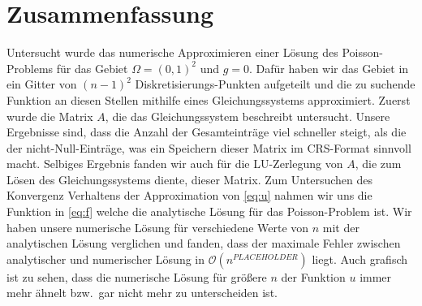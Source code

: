 \documentclass{scrartcl}
\newcommand\BigO{\mathcal{O}}
\begin{document}
\section{Zusammenfassung}

Untersucht wurde das numerische Approximieren einer Lösung des Poisson-Problems
für das Gebiet \(\Omega = {(0, 1)}^2\) und \(g = 0\). Dafür haben wir das
Gebiet in ein Gitter von \({(n - 1)}^2\) Diskretisierungs-Punkten aufgeteilt
und die zu suchende Funktion an diesen Stellen mithilfe eines Gleichungssystems
approximiert. Zuerst wurde die Matrix \(A\), die das Gleichungssystem
beschreibt untersucht. Unsere Ergebnisse sind, dass die Anzahl der
Gesamteinträge viel schneller steigt, als die der nicht-Null-Einträge, was ein
Speichern dieser Matrix im CRS-Format sinnvoll macht. Selbiges Ergebnis fanden
wir auch für die LU-Zerlegung von \(A\), die zum Lösen des Gleichungssystems
diente, dieser Matrix. Zum Untersuchen des Konvergenz Verhaltens der
Approximation von \autoref{eq:u} nahmen wir uns die Funktion in \autoref{eq:f}
welche die analytische Lösung für das Poisson-Problem ist. Wir haben unsere
numerische Lösung für verschiedene Werte von \(n\) mit der analytischen Lösung
verglichen und fanden, dass der maximale Fehler zwischen analytischer und
numerischer Lösung in \(\BigO(n^{PLACEHOLDER})\) liegt. Auch grafisch ist zu
sehen, dass die numerische Lösung für größere \(n\) der Funktion \(u\) immer
mehr ähnelt bzw.\ gar nicht mehr zu unterscheiden ist.

\printbibliography%
\end{document}
